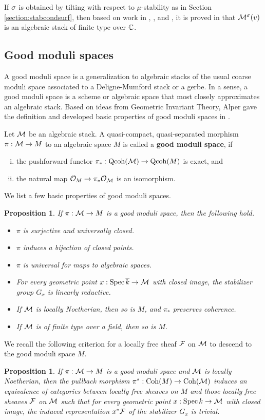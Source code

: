 \documentclass[letterpaper,11pt]{amsart}%
\newtheorem{prop}[thm]{Proposition}
\theoremstyle{remark}
\begin{document}
If $\sigma$ is obtained by tilting with respect to $\mu$-stability as in Section \ref{section:stabcondsurf}, then based on work in \cite{lie06}, \cite{ABL13}, and \cite{AP06}, it is proved in \cite{toda08} that $\mathcal{M}^\sigma(v)$ is an algebraic stack of finite type over $\mathbb{C}$. 

\subsection{Good moduli spaces}
A good moduli space is a generalization to algebraic stacks of the usual coarse moduli space associated to a Deligne-Mumford stack or a gerbe. In a sense, a good moduli space is a scheme or algebraic space that most closely approximates an algebraic stack. Based on ideas from Geometric Invariant Theory, Alper gave the definition and developed basic properties of good moduli spaces in \cite{AlperGMS}.

Let $\mathcal{M}$ be an algebraic stack. A quasi-compact, quasi-separated morphism $\pi: \mathcal{M} \to M$ to an algebraic space $M$ is called a {\bf good moduli space}, if 
\begin{enumerate}[(i)]
    \item the pushforward functor $\pi_*: \mathrm{Qcoh}(\mathcal{M}) \to \mathrm{Qcoh}(M)$ is exact, and
    \item the natural map $\mathcal{O}_M \to \pi_*\mathcal{O}_{\mathcal{M}}$ is an isomorphism.
\end{enumerate}
We list a few basic properties of good moduli spaces.
\begin{prop}
    If $\pi: \mathcal{M} \to M$ is a good moduli space, then the following hold. \begin{itemize}
        \item $\pi$ is surjective and universally closed.
        \item $\pi$ induces a bijection of closed points.
        \item $\pi$ is universal for maps to algebraic spaces.
        \item For every geometric point $x: \operatorname{\mathrm{Spec}} \overline{k} \to \mathcal{M}$ with closed image, the stabilizer group $G_x$ is linearly reductive.
        \item If $\mathcal{M}$ is locally Noetherian, then so is $M$, and $\pi_*$ preserves coherence.
        \item If $\mathcal{M}$ is of finite type over a field, then so is $M$.
    \end{itemize}
\end{prop}

We recall the following criterion \cite[Theorem 10.3]{AlperGMS} for a locally free sheaf $\mathcal{F}$ on $\mathcal{M}$ to descend to the good moduli space $M$. 
\begin{prop}\label{vbtogms}
    If $\pi: \mathcal{M} \to M$ is a good moduli space and $\mathcal{M}$ is locally Noetherian, then the pullback morphism $\pi^*: \mathrm{Coh}(M) \to \mathrm{Coh}(\mathcal{M})$ induces an equivalence of categories between locally free sheaves on $M$ and those locally free sheaves $\mathcal{F}$ on $\mathcal{M}$ such that for every geometric point $x: \operatorname{\mathrm{Spec}} k \to \mathcal{M}$ with closed image, the induced representation $x^*\mathcal{F}$ of the stabilizer $G_x$ is trivial.
\end{prop}
\end{document}
